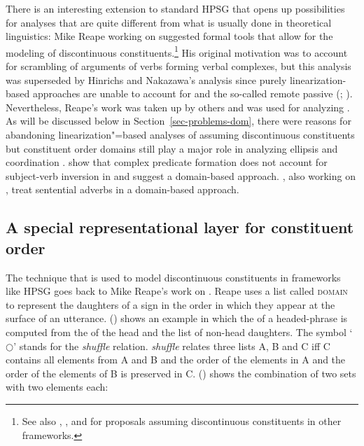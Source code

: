 \documentclass[output=paper
	        ,collection
	        ,collectionchapter
 	        ,biblatex
                ,babelshorthands
                ,newtxmath
                ,draftmode
                ,colorlinks, citecolor=brown
]{langscibook}
\begin{document}
There is an interesting extension to standard HPSG that opens up possibilities for analyses that are
quite different from what is usually done in theoretical linguistics: Mike Reape
\citeyearpar{Reape91,Reape92a,Reape94a} working on  suggested formal tools that allow for the
modeling of discontinuous constituents.\footnote{
  See also , , and  for proposals assuming discontinuous constituents in other frameworks.%
} His original motivation was to account for scrambling of arguments of verbs forming
verbal complexes, but this analysis was superseded by Hinrichs and Nakazawa's analysis
\citep{HN89a,HN94a} since purely linearization-based approaches are unable to account for 
and the so-called remote passive (\citealp[Section~5.1, Section~5.2]{Kathol98b};
\citealp[Chapter~21.1]{Mueller99a}). Nevertheless, Reape's work was taken up by others and was used for analyzing 
\citep{KP95a,Kathol2000a,Mueller95c,Babel,Mueller2004b,Wetta2011a,Wetta2014a-u}. As will be
discussed below in Section~\ref{sec-problems-dom}, there were reasons for abandoning
linearization"=based analyses of  assuming discontinuous constituents
\parencites{Mueller2005d}[Chapter~6]{MuellerGS} but constituent order
domains still play a major role in analyzing ellipsis  and
coordination \crossrefchapterp[\page
  \pageref{page-linearization-domains-in-coordination-one}, \pageref{page-linearization-domains-in-coordination-two}]{coordination}.  \citet*{BGM99a} show that complex
predicate formation does not account for subject-verb inversion in  and suggest a
domain-based approach. \citet{BG2007b-u}, also working on , treat sentential adverbs in
a domain-based approach.

\subsection{A special representational layer for constituent order}
\label{order:sec-domains}

The technique that is used to model discontinuous constituents in frameworks like HPSG goes back to Mike Reape's work on 
\citeyearpar{Reape91,Reape92a,Reape94a}. 
Reape uses a list called \textsc{domain} to represent the daughters of a sign in the order in
which they appear at the surface of an utterance. () shows an example in which the \domv of a
headed-phrase is computed from the \domv of the head and the list of non-head daughters.
\ea
\label{ex-shuffeling-daughters}
 \impl
{}
\z
The symbol `$\bigcirc$'\is{$\bigcirc$}\label{rel-shuffle}
stands for the \emph{shuffle} relation. \emph{shuffle} relates three lists A, B and C iff C
contains all elements from A and B and the order of the elements in A and the order of the elements
of B is preserved in C. () shows the combination of two sets with two elements each:
\end{document}
